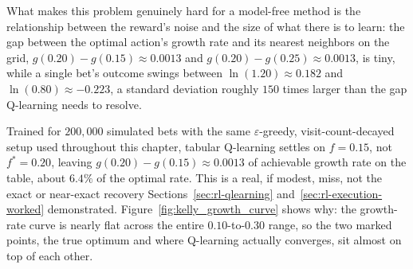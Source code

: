 \documentclass[../ai_in_finance]{subfiles}
\begin{document}
What makes this problem genuinely hard for a model-free method is the relationship between the reward's noise and the size of what there is to learn: the gap between the optimal action's growth rate and its nearest neighbors on the grid, $g(0.20)-g(0.15)\approx0.0013$ and $g(0.20)-g(0.25)\approx0.0013$, is tiny, while a single bet's outcome swings between $\ln(1.20)\approx0.182$ and $\ln(0.80)\approx-0.223$, a standard deviation roughly $150$ times larger than the gap Q-learning needs to resolve.

Trained for $200{,}000$ simulated bets with the same $\varepsilon$-greedy, visit-count-decayed setup used throughout this chapter, tabular Q-learning settles on $f=0.15$, not $f^*=0.20$, leaving $g(0.20)-g(0.15)\approx0.0013$ of achievable growth rate on the table, about $6.4\%$ of the optimal rate. This is a real, if modest, miss, not the exact or near-exact recovery Sections~\ref{sec:rl-qlearning} and~\ref{sec:rl-execution-worked} demonstrated. Figure~\ref{fig:kelly_growth_curve} shows why: the growth-rate curve is nearly flat across the entire $0.10$-to-$0.30$ range, so the two marked points, the true optimum and where Q-learning actually converges, sit almost on top of each other.

\begin{figure}[htbp]
\centering
\begin{lrbox}{\bookmeasuredbox}
\end{lrbox}
\ifdim\wd\bookmeasuredbox<0.65\linewidth
\setlength{\bookcapwidth}{0.65\linewidth}
\else
\setlength{\bookcapwidth}{\wd\bookmeasuredbox}
\fi
{}
\end{figure}
\end{document}
